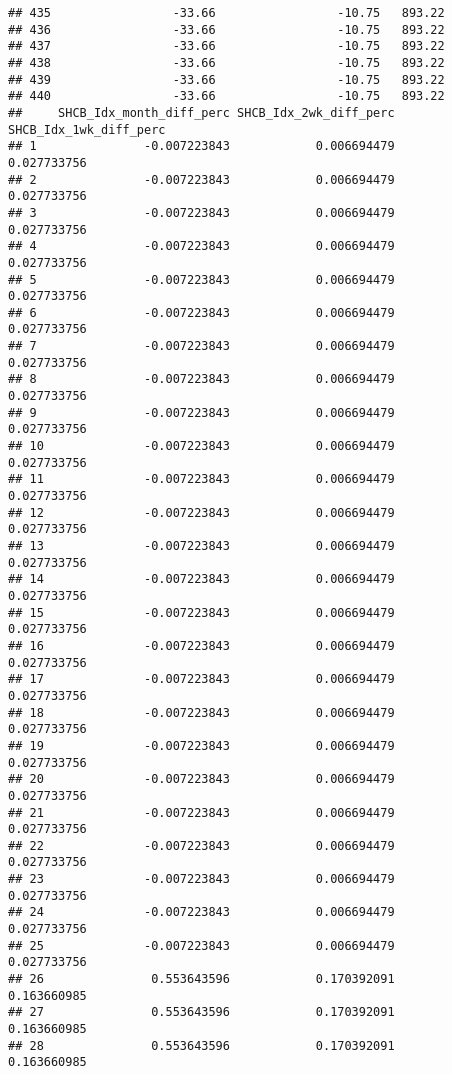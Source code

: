 \documentclass[]{article}
\begin{document}
\begin{verbatim}
## 435                 -33.66                 -10.75   893.22
## 436                 -33.66                 -10.75   893.22
## 437                 -33.66                 -10.75   893.22
## 438                 -33.66                 -10.75   893.22
## 439                 -33.66                 -10.75   893.22
## 440                 -33.66                 -10.75   893.22
##     SHCB_Idx_month_diff_perc SHCB_Idx_2wk_diff_perc SHCB_Idx_1wk_diff_perc
## 1               -0.007223843            0.006694479            0.027733756
## 2               -0.007223843            0.006694479            0.027733756
## 3               -0.007223843            0.006694479            0.027733756
## 4               -0.007223843            0.006694479            0.027733756
## 5               -0.007223843            0.006694479            0.027733756
## 6               -0.007223843            0.006694479            0.027733756
## 7               -0.007223843            0.006694479            0.027733756
## 8               -0.007223843            0.006694479            0.027733756
## 9               -0.007223843            0.006694479            0.027733756
## 10              -0.007223843            0.006694479            0.027733756
## 11              -0.007223843            0.006694479            0.027733756
## 12              -0.007223843            0.006694479            0.027733756
## 13              -0.007223843            0.006694479            0.027733756
## 14              -0.007223843            0.006694479            0.027733756
## 15              -0.007223843            0.006694479            0.027733756
## 16              -0.007223843            0.006694479            0.027733756
## 17              -0.007223843            0.006694479            0.027733756
## 18              -0.007223843            0.006694479            0.027733756
## 19              -0.007223843            0.006694479            0.027733756
## 20              -0.007223843            0.006694479            0.027733756
## 21              -0.007223843            0.006694479            0.027733756
## 22              -0.007223843            0.006694479            0.027733756
## 23              -0.007223843            0.006694479            0.027733756
## 24              -0.007223843            0.006694479            0.027733756
## 25              -0.007223843            0.006694479            0.027733756
## 26               0.553643596            0.170392091            0.163660985
## 27               0.553643596            0.170392091            0.163660985
## 28               0.553643596            0.170392091            0.163660985

\end{verbatim}
\end{document}
